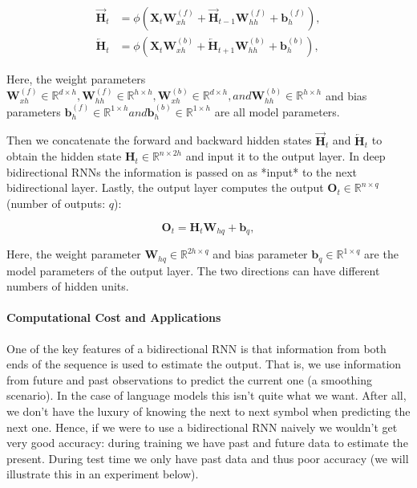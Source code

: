$$
\begin{aligned}
\overrightarrow{\mathbf{H}}_t &= \phi(\mathbf{X}_t \mathbf{W}_{xh}^{(f)} + \overrightarrow{\mathbf{H}}_{t-1} \mathbf{W}_{hh}^{(f)}  + \mathbf{b}_h^{(f)}),\\
\overleftarrow{\mathbf{H}}_t &= \phi(\mathbf{X}_t \mathbf{W}_{xh}^{(b)} + \overleftarrow{\mathbf{H}}_{t+1} \mathbf{W}_{hh}^{(b)}  + \mathbf{b}_h^{(b)}),
\end{aligned}
$$

Here, the weight parameters $\mathbf{W}_{xh}^{(f)} \in \mathbb{R}^{d \times h}, \mathbf{W}_{hh}^{(f)} \in \mathbb{R}^{h \times h}, \mathbf{W}_{xh}^{(b)} \in \mathbb{R}^{d \times h}, and \mathbf{W}_{hh}^{(b)} \in \mathbb{R}^{h \times h}$ and bias parameters $\mathbf{b}_h^{(f)} \in \mathbb{R}^{1 \times h} and \mathbf{b}_h^{(b)} \in \mathbb{R}^{1 \times h}$ are all model parameters.

Then we concatenate the forward and backward hidden states $\overrightarrow{\mathbf{H}}_t$ and $\overleftarrow{\mathbf{H}}_t$ to obtain the hidden state $\mathbf{H}_t \in \mathbb{R}^{n \times 2h}$ and input it to the output layer. In deep bidirectional RNNs the information is passed on as *input* to the next bidirectional layer. Lastly, the output layer computes the output $\mathbf{O}_t \in \mathbb{R}^{n \times q}$ (number of outputs: $q$):

$$\mathbf{O}_t = \mathbf{H}_t \mathbf{W}_{hq} + \mathbf{b}_q,$$

Here, the weight parameter $\mathbf{W}_{hq} \in \mathbb{R}^{2h \times q}$ and bias parameter $\mathbf{b}_q \in \mathbb{R}^{1 \times q}$ are the model parameters of the output layer. The two directions can have different numbers of hidden units.

\paragraph{Computational Cost and Applications}

One of the key features of a bidirectional RNN is that information from both ends of the sequence is used to estimate the output. That is, we use information from future and past observations to predict the current one (a smoothing scenario). In the case of language models this isn't quite what we want. After all, we don't have the luxury of knowing the next to next symbol when predicting the next one. Hence, if we were to use a bidirectional RNN naively we wouldn't get very good accuracy: during training we have past and future data to estimate the present. During test time we only have past data and thus poor accuracy (we will illustrate this in an experiment below).

